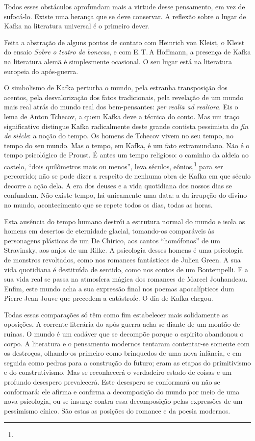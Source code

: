Todos esses obstáculos aprofundam
mais a virtude desse pensamento, em vez
de sufocá-lo. Existe uma herança que se deve conservar. A reflexão sobre o lugar de Kafka na literatura universal é o primeiro dever.

Feita a abstração de alguns pontos de contato com Heinrich von Kleist, o Kleist
do ensaio \textit{Sobre o teatro de bonecas}, e com E.\,T.\,A Hoffmann, a presença
de Kafka na literatura alemã é simplesmente ocasional. O seu lugar está
na literatura europeia do após-guerra.

O simbolismo de Kafka perturba
o mundo, pela estranha transposição dos acentos, pela desvalorização dos fatos tradicionais, pela revelação de um mundo mais real atrás do mundo real dos bem-pensantes: \textit{per realia ad realiora}. Eis o lema de Anton Tchecov, a quem Kafka deve a técnica do conto. Mas
um traço significativo distingue Kafka radicalmente deste grande
contista pessimista do \textit{fin de siècle}: a noção do tempo. Os homens de
Tchecov vivem no seu tempo, no tempo do seu
mundo. Mas o tempo, em Kafka, é um fato extramundano. Não é o tempo
psicológico de Proust. É antes um tempo religioso: o caminho da aldeia ao castelo, ``dois quilômetros mais ou menos'', leva séculos, eônios,\footnote{} para ser
percorrido; não se pode dizer a respeito de nenhuma obra de Kafka em que
século decorre a ação dela. A era dos deuses e a vida quotidiana dos
nossos dias se confundem. Não existe tempo, há unicamente uma data: a da
irrupção do divino no mundo, acontecimento que se repete todos os dias, todas as horas.

Esta ausência do tempo humano destrói a estrutura
normal do mundo e isola os
homens em desertos de eternidade glacial, tomando-os comparáveis às
personagens plásticas de um De Chirico, aos cantos ``homófonos'' de um
Stravinsky, aos anjos de um Rilke. A psicologia desses homens é uma
psicologia de monstros revoltados, como nos romances fantásticos de
Julien Green. A sua vida quotidiana é destituída de sentido, como nos
contos de um Bontempelli. E a sua vida real se
passa na atmosfera mágica dos romances de Marcel Jouhandeau. Enfim, este
mundo acha a sua expressão final nos poemas apocalípticos dum
Pierre-Jean Jouve que precedem a catástrofe. O dia de Kafka chegou.

Todas essas comparações só têm como fim estabelecer mais solidamente as oposições. A corrente literária do após-guerra acha-se diante de um montão de 
ruínas. O mundo é um cadáver que se decompõe porque o espirito abandonou
o corpo. A literatura e o pensamento modernos tentaram contentar-se
somente com os destroços, olhando-os primeiro como brinquedos de uma
nova infância, e em seguida como pedras para a construção do futuro;
eram as etapas do primitivismo e do construtivismo. Mas se reconhecerá o
verdadeiro estado de coisas e um profundo desespero prevalecerá. Este
desespero se conformará ou não se conformará: ele afirma e confirma a
decomposição do mundo por meio de uma nova psicologia, ou se insurge
contra essa decomposição pelas expressões de um pessimismo cínico. São
estas as posições do romance e da poesia modernos.

